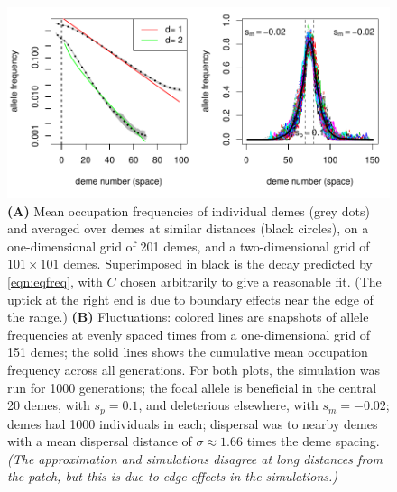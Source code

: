 \documentclass{article}
\newcommand{\gc}[1]{{\it\color{green}(#1)} }
\begin{document}
\begin{figure}[ht!]
  \begin{center}
    \includegraphics{sim-occupation-freqs}
  \end{center}
  \caption{
  \textbf{(A)} 
  Mean occupation frequencies of individual demes (grey dots)
  and averaged over demes at similar distances (black circles), on
  a one-dimensional grid of 201 demes, and
  a two-dimensional grid of $101\times 101$ demes.
  Superimposed in black is the decay predicted by \eqref{eqn:eqfreq},
  with $C$ chosen arbitrarily to give a reasonable fit.
  (The uptick at the right end is due to boundary effects near the edge of the range.)
  \textbf{(B)} 
  Fluctuations: colored lines are snapshots of allele frequencies at evenly spaced times
  from a one-dimensional grid of 151 demes;
  the solid lines shows the cumulative mean occupation frequency across all generations.
  For both plots, the simulation was run for 1000 generations;
  the focal allele is beneficial in the central 20 demes, with $s_p=0.1$,
  and deleterious elsewhere, with $s_m=-0.02$; 
  demes had 1000 individuals in each;
  dispersal was to nearby demes with a mean dispersal distance of $\sigma \approx 1.66$  times the deme spacing.
 \gc{The approximation and simulations disagree at long distances from
   the patch, but this is due to edge effects in the simulations.} }   \label{fig:sim_occupation_freqs}
\end{figure}
\end{document}
